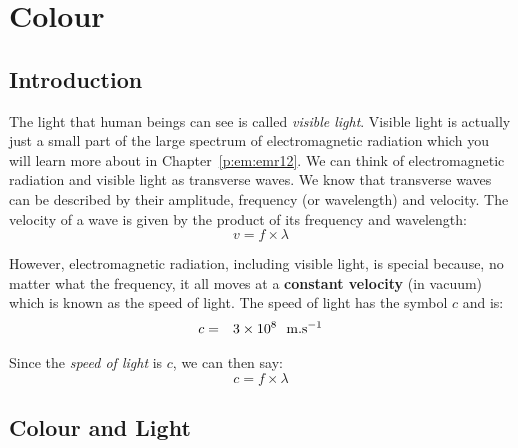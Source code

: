 \chapter{Colour} 
\label{p:wsl:c12} 


\section{Introduction} 
The light that human beings can see is called \textit{visible light}. Visible light is actually just a small part of the large spectrum of electromagnetic radiation which you will learn more about in Chapter~\ref{p:em:emr12}. We can think of electromagnetic radiation and visible light as transverse waves. We know that transverse waves can be described by their amplitude, frequency (or wavelength) and velocity. The velocity of a wave is given by the product of its frequency and wavelength:
\begin{equation}
v = f \times \lambda
\end{equation}\label{eq:wavespeed} 

However, electromagnetic radiation, including visible light, is special because, no matter what the frequency, it all moves at a \textbf{constant velocity} (in vacuum) which is known as the speed of light. The speed of light has the symbol $c$ and is:
\begin{eqnarray*}
c &=& 3 \times 10^{8}~~\rm{m.s^{-1}}
\end{eqnarray*} 

Since the \textit{speed of light} is $c$, we can then say:
\begin{equation}
c = f \times \lambda
\end{equation}




\section{Colour and Light} 

